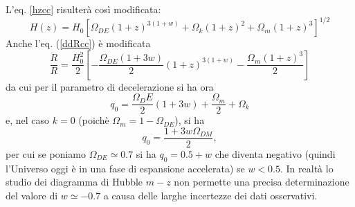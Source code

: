L'eq. \eqref{hzcc} risulterà così modificata:
\begin{equation}
  H(z)=H_0 \left[ \Omega_{DE} (1+z)^{3(1+w)} + \Omega_{k} (1+z)^2+ \Omega_m
    (1+z)^3 \right]^{1/2}
  \label{hzccX}
\end{equation}
Anche l'eq. (\ref{ddRcc}) è modificata
\begin{equation}
  \frac {\ddot{R}} {R} = \frac{H_0^2}{2}
  \left[ - \frac{\Omega_{DE} (1+3w)}{2} (1+z)^{3(1+w)}
    -\frac {\Omega_m (1+z)^3} {2 } \right]
  \label {ddRw}
\end{equation}
da cui per il parametro di decelerazione si ha ora
\begin{equation}
  q_0= \frac{\Omega_DE}{2} (1+3w) +  \frac{\Omega_m}{2} + \Omega_{k}
\end{equation}
e, nel caso $k=0$ (poichè $\Omega_m = 1 - \Omega_{DE}$), si ha
\begin{equation}
  q_0= \frac {1+3w \Omega_{DM}}{2},
\end{equation}
per cui se poniamo $\Omega_{DE} \simeq 0.7$ si ha $q_0 =0.5+w$ che diventa
negativo (quindi l'Universo oggi è in una fase di espansione accelerata) se
$w<0.5$.  In realtà lo studio dei diagramma di Hubble $m-z$ non permette una
precisa determinazione del valore di $w \simeq -0.7$ a causa delle larghe
incertezze dei dati osservativi.


